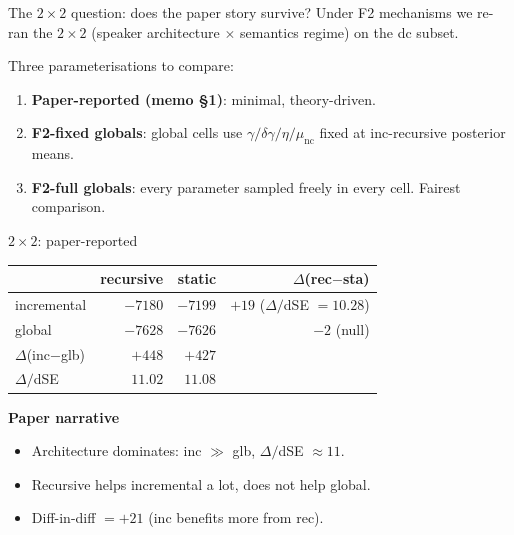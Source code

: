 \documentclass[10pt,aspectratio=169]{beamer}
\newcommand{\main}[1]{\textcolor{CSP-main-dark}{\textbf{#1}}}
\newcommand{\emp}[1]{\textcolor{CSP-emphasis}{\textbf{#1}}}
\begin{document}
\begin{frame}{The $2\!\times\!2$ question: does the paper story survive?}
Under F2 mechanisms we re-ran the $2\!\times\!2$ (speaker architecture $\times$ semantics regime) on the dc subset.

\vspace{0.8em}
Three parameterisations to compare:
\begin{enumerate}\itemsep0.3em
  \item \main{Paper-reported (memo \S1)}: minimal, theory-driven.
  \item \main{F2-fixed globals}: global cells use $\gamma/\delta\gamma/\eta/\mu_\mathrm{nc}$ fixed at inc-recursive posterior means.
  \item \emp{F2-full globals}: every parameter sampled freely in every cell. Fairest comparison.
\end{enumerate}
\end{frame}

\begin{frame}{$2\!\times\!2$: paper-reported}
\begin{center}
\begin{tabular}{l|rr|r}
\toprule
             & recursive & static & $\Delta$(rec$-$sta) \\
\midrule
incremental  & $-7180$ & $-7199$ & \main{$+19$} ($\Delta/$dSE $= 10.28$) \\
global       & $-7628$ & $-7626$ & $-2$ (null) \\
\midrule
$\Delta$(inc$-$glb) & $+448$ & $+427$ & \\
$\Delta/$dSE        & $11.02$ & $11.08$ & \\
\bottomrule
\end{tabular}
\end{center}

\vspace{0.8em}
\main{Paper narrative}
\begin{itemize}\itemsep0.2em
  \item Architecture dominates: inc $\gg$ glb, $\Delta/$dSE $\approx 11$.
  \item Recursive helps incremental a lot, does not help global.
  \item Diff-in-diff $= +21$ (inc benefits more from rec).
\end{itemize}
\end{frame}
\end{document}
